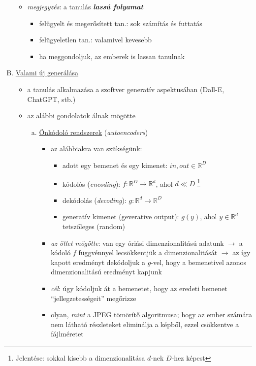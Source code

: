 \documentclass[a4paper, 11pt]{article}
\begin{document}
\begin{enumerate}[A)]
\begin{itemize}
\begin{enumerate}[(a)]
\begin{itemize}
			\end{itemize}
		\end{enumerate}
		\item \textit{megjegyzés}: a tanulás \textbf{\textit{lassú folyamat}}
		\begin{itemize}
			\item felügyelt és megerősített tan.: sok számítás és futtatás
			\item felügyeletlen tan.: valamivel kevesebb
			\item ha meggondoljuk, az emberek is lassan tanulnak
		\end{itemize}
	\end{itemize}
	\item \underline{Valami új generálása}
	\begin{itemize}
		\item a tanulás alkalmazása a szoftver generatív aspektusában (Dall-E, ChatGPT, stb.)
		\item az alábbi gondolatok álnak mögötte
		\begin{enumerate}[(a)]
			\item \underline{Önkódoló rendszerek} (\textit{autoencoders})
			\begin{itemize}
				\item az alábbiakra van szükségünk:
				\begin{itemize}
					\item adott egy bemenet és egy kimenet: $\boxed{in, out \in \mathbb{R}^D}$
					\item kódolós (\textit{encoding}): $\boxed{f : \mathbb{R}^D \to \mathbb{R}^d}$, ahol $d \ll  D$ \footnote{Jelentése: sokkal kisebb a dimenzionalitása $d$-nek $D$-hez képest}
					\item dekódolás (\textit{decoding}): $\boxed{g : \mathbb{R}^d \to \mathbb{R}^D}$
					\item generatív kimenet (geverative output): $\boxed{g(y)}$, ahol $y \in \mathbb{R}^d$ tetszőleges (random)
				\end{itemize}
				\item \textit{az ötlet mögötte}: van egy óriási dimenzionalitású adatunk $\to$ a kódoló $f$ függvénnyel lecsökkentjük a dimenzionalitását $\to$ az így kapott eredményt dekódoljuk a $g$-vel, hogy a bemenetivel azonos dimenzionalitású eredményt kapjunk
				\item \textit{cél}: úgy kódoljuk át a bemenetet, hogy az eredeti bemenet ``jellegzetességeit'' megőrizze
				\item olyan, \textit{mint} a JPEG tömörítő algoritmusa; hogy az ember számára nem látható részleteket eliminálja a képből, ezzel csökkentve a fájlméretet

\end{itemize}
\end{enumerate}
\end{itemize}
\end{enumerate}
\end{document}
